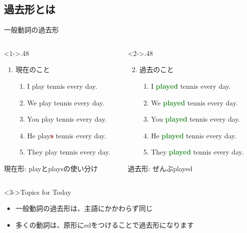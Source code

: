 \documentclass[aspectratio=169,xcolor={dvipsnames,table}]{beamer}
\newcommand{\myaudio}[1]{\href{#1}{\faVolumeUp}}
\begin{document}
\subsection{過去形とは}
\begin{frame}[plain]{一般動詞の過去形}
 \Large

\begin{columns}
\begin{column}<1->{.48\textwidth}
\begin{enumerate}
 \item 現在のこと
       \begin{enumerate}
	\item I play tennis every day.
	\item We play tennis every day.
	\item You play tennis every day.
	\item He play\textcolor{Maroon}{\bfseries s} tennis every day.
	\item They play tennis every day.
       \end{enumerate}
\end{enumerate}

{\small 現在形: playとplaysの使い分け}
\end{column}
\begin{column}<2->{.48\textwidth}
\begin{enumerate}
\setcounter{enumi}{1} \item 過去のこと
        \begin{enumerate}
	\item I \textcolor{ForestGreen}{\bfseries played} tennis every day.
	\item We \textcolor{ForestGreen}{\bfseries played} tennis every day.
	\item You \textcolor{ForestGreen}{\bfseries played} tennis every day.
	\item He \textcolor{ForestGreen}{\bfseries played} tennis every day.
	\item They \textcolor{ForestGreen}{\bfseries played} tennis every day.
       \end{enumerate}
\end{enumerate}

{\small 過去形: ぜんぶplayed}
\end{column}
\end{columns}

\begin{exampleblock}<3->{Topics for Today}\small
\begin{itemize}
 \item 一般動詞の過去形は、主語にかかわらず同じ
 \item 多くの動詞は、原形にedをつけることで過去形になります
\end{itemize}
\end{exampleblock}

\hfill\myaudio{./audio/025_past_do_01.mp3}
\end{frame}
\end{document}
